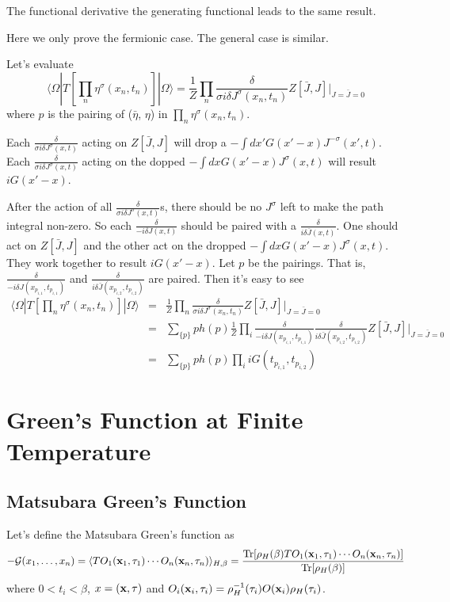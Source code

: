 \documentclass[12pt]{book}
\begin{document}
	The functional derivative the generating functional leads to the same result.
	
	Here we only prove the fermionic case. The general case is similar.
	
	Let's evaluate
	\begin{equation}
		\langle \Omega|T[\prod_n\eta^\sigma(x_n,t_n)]|\Omega\rangle=\frac 1Z\prod_n \frac\delta{\sigma i\delta J^\sigma(x_n,t_n)}Z[\bar J,J]\Big|_{J=\bar J=0}
	\end{equation}
	where $p$ is the pairing of ($\bar\eta$, $\eta$) in $\prod_n\eta^\sigma(x_n,t_n)$.
	
	Each $\frac\delta{\sigma i\delta J^\sigma(x,t)}$ acting on $Z[\bar J,J]$ will drop a $-\int dx'G(x'-x)J^{-\sigma}(x',t)$. Each $\frac\delta{\sigma i\delta J^\sigma(x,t)}$ acting on the dopped  $-\int dxG(x'-x)J^{\sigma}(x,t)$ will result $iG(x'-x)$.
	
	After the action of all $\frac\delta{\sigma i\delta J^\sigma(x,t)}$s, there should be no $J^\sigma$ left to make the path integral non-zero. So each $\frac\delta{- i\delta J(x,t)}$ should be paired with a $\frac\delta{i\delta \bar J(x,t)}$. One should act on $Z[\bar J,J]$ and the other act on the dropped $-\int dxG(x'-x)J^{\sigma}(x,t)$. They work together to result $iG(x'-x)$. Let $p$ be the pairings. That is, $\frac\delta{-i\delta J(x_{p_{i,1}},t_{p_{i,1}})}$ and $\frac\delta{ i\delta \bar J(x_{p_{i,2}},t_{p_{i,2}})}$ are paired. Then it's easy to see
	\begin{eqnarray}
		\langle \Omega|T[\prod_n\eta^\sigma(x_n,t_n)]|\Omega\rangle&=&\frac 1Z\prod_n \frac\delta{\sigma i\delta J^\sigma(x_n,t_n)}Z[\bar J,J]\Big|_{J=\bar J=0}\\
		&=&\sum_{\{p\}}ph(p)\frac 1Z\prod_i \frac\delta{-i\delta J(x_{p_{i,1}},t_{p_{i,1}})}\frac\delta{ i\delta \bar J(x_{p_{i,2}},t_{p_{i,2}})}Z[\bar J,J]\Big|_{J=\bar J=0}\\
		&=&\sum_{\{p\}}ph(p)\prod_i iG(t_{p_{i,1}},t_{p_{i,2}})
	\end{eqnarray}
	
	\chapter{Green's Function at Finite Temperature}
	\section{Matsubara Green's Function}
	
	Let's define the Matsubara Green's function as
	\begin{equation}
		-\mathcal G(x_1,\dots,x_n)=\langle TO_1({\bf x}_1,\tau_1)\cdots O_n({\bf x}_n,\tau_n)\rangle_{H,\beta}=\frac{{\rm Tr}[\rho_H(\beta)TO_1({\bf x}_1,\tau_1)\cdots O_n({\bf x}_n,\tau_n)]}{{\rm Tr}[\rho_H(\beta)]}
	\end{equation}
	where $0<t_i<\beta$, $x=({\bf x},\tau)$ and $O_i({\bf x}_i,\tau_i)=\rho^{-1}_H(\tau_i)O({\bf x}_i)\rho_H(\tau_i)$.
	
\end{document}
